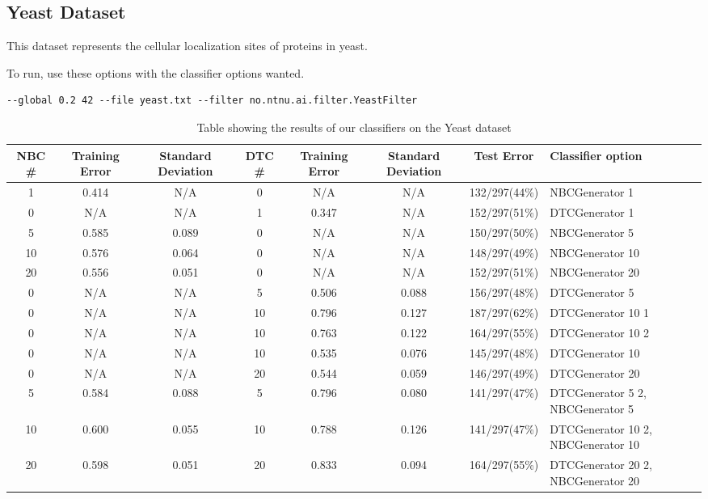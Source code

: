 \subsection{Yeast Dataset}\label{yeast}
This dataset represents the cellular localization sites of proteins in yeast.

To run, use these options with the classifier options wanted.

\begin{lstlisting}[label=lst:yeast, caption=Yeast dataset general 
options]
--global 0.2 42 --file yeast.txt --filter no.ntnu.ai.filter.YeastFilter
\end{lstlisting}

\begin{landscape}
\begin{table}
\begin{tabular}{|c|c|c||c|c|c||c||p{5cm}|}
\hline
NBC \# & Training Error & Standard Deviation & DTC \# & Training Error
& Standard Deviation & Test Error & Classifier option \\ \hline
1 & 0.414 & N/A & 0 & N/A & N/A & 132/297(44\%) & NBCGenerator 1 \\ \hline
0 & N/A & N/A & 1 & 0.347 & N/A & 152/297(51\%) & DTCGenerator 1 \\ \hline
5 & 0.585 & 0.089 & 0 & N/A & N/A & 150/297(50\%) & NBCGenerator 5 \\ \hline
10 & 0.576 & 0.064 & 0 & N/A & N/A & 148/297(49\%) & NBCGenerator 10 \\ \hline
20 & 0.556 & 0.051 & 0 & N/A & N/A & 152/297(51\%) & NBCGenerator 20 \\ \hline
0 & N/A & N/A & 5 & 0.506 & 0.088 & 156/297(48\%) & DTCGenerator 5 \\ \hline
0 & N/A & N/A & 10 & 0.796 & 0.127 & 187/297(62\%) & DTCGenerator 10 1 \\ 
\hline
0 & N/A & N/A & 10 & 0.763 & 0.122 & 164/297(55\%) & DTCGenerator 10 2 \\ 
\hline
0 & N/A & N/A & 10 & 0.535 & 0.076 & 145/297(48\%) & DTCGenerator 10 \\ \hline
0 & N/A & N/A & 20 & 0.544 & 0.059 & 146/297(49\%) & DTCGenerator 20 \\ \hline
5 & 0.584 & 0.088 & 5 & 0.796 & 0.080 & 141/297(47\%) & DTCGenerator 5 2, 
\newline NBCGenerator 5 \\ \hline
10 & 0.600 & 0.055 & 10 & 0.788 & 0.126 & 141/297(47\%) & DTCGenerator 10 2, 
\newline NBCGenerator 10 \\ \hline
20 & 0.598 & 0.051 & 20 & 0.833 & 0.094 & 164/297(55\%) & DTCGenerator 20 2, 
\newline NBCGenerator 20 \\ \hline
\hline
\end{tabular}
\label{tab:yeast}
\caption[Yeast dataset boosting]{Table showing the results of our classifiers 
on the Yeast dataset}
\end{table}
\end{landscape}
